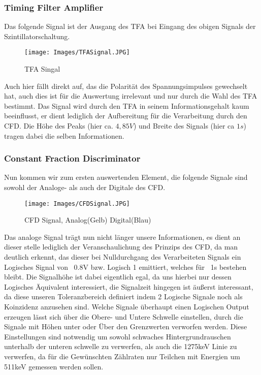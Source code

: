 \documentclass{article}
\begin{document}
            \subsubsection{Timing Filter Amplifier}
                Das folgende Signal ist der Ausgang des TFA bei Eingang des obigen Signals der Szintillatorschaltung.
                \begin{figure}[H]
                    \centering
                    \texttt{[image: Images/TFASignal.JPG]}
                    \caption{TFA Singal}
                \end{figure}
                Auch hier fällt direkt auf, das die Polarität des Spannungsimpulses gewechselt hat, auch dies ist für die Auswertung irrelevant und
                nur durch die Wahl des TFA bestimmt. \newline
                Das Signal wird durch den TFA in seinem Informationsgehalt kaum beeinflusst, er dient lediglich der Aufbereitung für
                die Verarbeitung durch den CFD. Die Höhe des Peaks (hier ca. $4,85V$) und Breite des Signals (hier ca $1s$) tragen dabei die selben
                Informationen.

            \subsubsection{Constant Fraction Discriminator}
                Nun kommen wir zum ersten auswertenden Element, die folgende Signale sind sowohl der Analoge- als auch der Digitale des CFD.
                \begin{figure}[H]
                    \centering
                    \texttt{[image: Images/CFDSignal.JPG]}
                    \caption{CFD Signal, Analog(Gelb) Digital(Blau)}
                \end{figure}
                Das analoge Signal trägt nun nicht länger unsere Informationen, es dient an dieser stelle lediglich der Veranschaulichung des
                Prinzips des CFD, da man deutlich erkennt, das dieser bei Nulldurchgang des Verarbeiteten Signals ein Logisches Signal
                von ~0.8V bzw. Logisch 1 emittiert, welches für ~1s bestehen bleibt. Die Signalhöhe ist dabei eigentlich egal, da uns hierbei nur
                dessen Logisches Äquivalent interessiert, die Signalzeit hingegen ist äußerst interessant, da diese unseren Toleranzbereich definiert
                indem 2 Logische Signale noch als Koinzidenz anzusehen sind. Welche Signale überhaupt einen Logischen Output erzeugen lässt sich über
                die Obere- und Untere Schwelle einstellen, durch die Signale mit Höhen unter oder Über den Grenzwerten verworfen werden. Diese Einstellungen
                sind notwendig um sowohl schwaches Hintergrundrauschen unterhalb der unteren schwelle zu verwerfen, als auch die 1275keV Linie zu verwerfen,
                da für die Gewünschten Zählraten nur Teilchen mit Energien um 511keV gemessen werden sollen.
\end{document}
